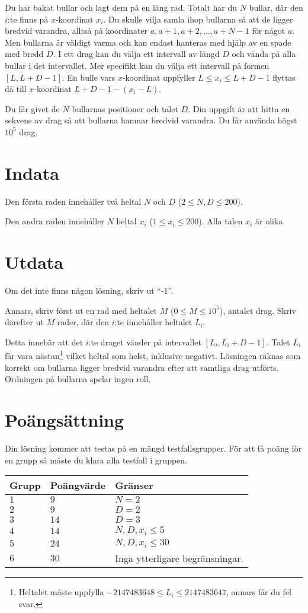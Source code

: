 Du har bakat bullar och lagt dem på en lång rad. Totalt har du $N$ bullar, där den $i$:te finns på
$x$-koordinat $x_i$. Du skulle vilja samla ihop bullarna så att de ligger bredvid varandra, alltså
på koordinater $a, a+1, a+2, \dots, a+N-1$ för något $a$. Men bullarna är väldigt varma och kan 
endast hanteras med hjälp av en spade med bredd $D$. I ett drag kan du välja ett intervall av längd
$D$ och vända på alla bullar i det intervallet. Mer specifikt kan du välja ett intervall på formen
$[L, L+D-1]$. En bulle vars $x$-koordinat uppfyller $L \leq x_i \leq L+D-1$ flyttas då till $x$-koordinat
$L + D - 1 - (x_i - L)$.

Du får givet de $N$ bullarnas positioner och talet $D$. Din uppgift är att hitta en sekvens av drag
så att bullarna hamnar bredvid varandra. Du får använda högst $10^5$ drag.


\section*{Indata}
Den första raden innehåller två heltal $N$ och $D$ ($2 \leq N, D \leq 200$).

Den andra raden innehåller $N$ heltal $x_i$ ($1 \leq x_i \leq 200$). Alla talen $x_i$ är olika.

\section*{Utdata}
Om det inte finns någon lösning, skriv ut ``-1''.

Annars, skriv först ut en rad med heltalet $M$ ($0 \leq M \leq 10^5$), antalet drag.
Skriv därefter ut $M$ rader, där den $i$:te innehåller heltalet $L_i$.

Detta innebär att det $i$:te draget vänder på intervallet $[L_i, L_i + D - 1]$.
Talet $L_i$ får vara nästan\footnote{Heltalet måste uppfylla $-2147483648 \leq L_i \leq 2147483647$, annars får du fel svar.} vilket heltal som helst, inklusive negativt. 
Lösningen räknas som korrekt om bullarna ligger bredvid varandra efter att samtliga drag utförts.
Ordningen på bullarna spelar ingen roll.

\section*{Poängsättning}
Din lösning kommer att testas på en mängd testfallsgrupper.
För att få poäng för en grupp så måste du klara alla testfall i gruppen.

\noindent
\begin{tabular}{| l | l | l |}
  \hline
  Grupp & Poängvärde & Gränser \\ \hline
  $1$    & $9$        &  $N=2$ \\ \hline 
  $2$    & $9$        &  $D=2$ \\ \hline
  $3$    & $14$        &  $D=3$ \\ \hline
  $4$    & $14$        &  $N, D, x_i \leq 5$ \\ \hline 
  $5$    & $24$        &  $N, D, x_i \leq 30$ \\ \hline
  $6$    & $30$        &  Inga ytterligare begränsningar. \\ \hline
\end{tabular}
